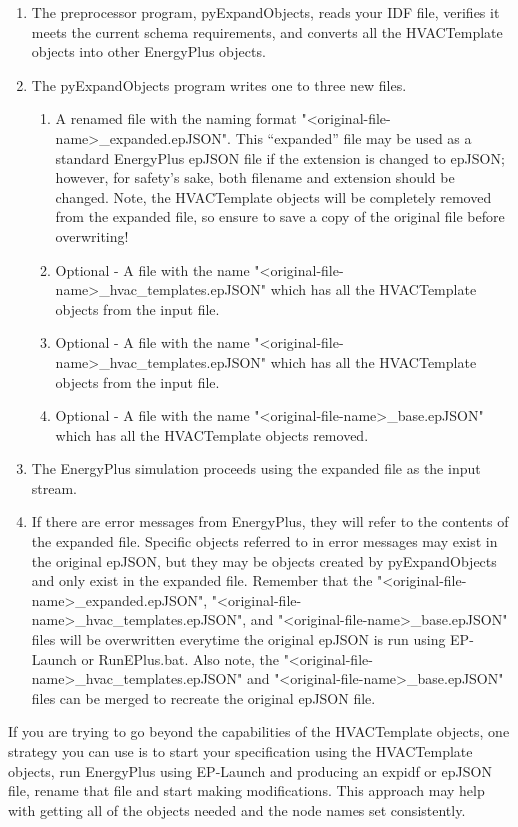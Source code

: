 \begin{enumerate}
\def\labelenumi{\arabic{enumi})}
\item
  The preprocessor program, pyExpandObjects, reads your IDF file, verifies it meets the current schema requirements, and converts all the HVACTemplate objects into other EnergyPlus objects.
\item
  The pyExpandObjects program writes one to three new files.  
  \begin{enumerate}
  \item
    A renamed file with the naming format "<original-file-name>\_expanded.epJSON". This “expanded” file may be used as a standard EnergyPlus epJSON file if the extension is changed to epJSON; however, for safety’s sake, both filename and extension should be changed.  Note, the HVACTemplate objects will be completely removed from the expanded file, so ensure to save a copy of the original file before overwriting!
  \item
    Optional - A file with the name "<original-file-name>\_hvac\_templates.epJSON" which has all the HVACTemplate objects from the input file.
  \item
    Optional - A file with the name "<original-file-name>\_hvac\_templates.epJSON" which has all the HVACTemplate objects from the input file.
  \item
    Optional - A file with the name "<original-file-name>\_base.epJSON" which has all the HVACTemplate objects removed.
  \end{enumerate}
  \item
    The EnergyPlus simulation proceeds using the expanded file as the input stream.
  \item
    If there are error messages from EnergyPlus, they will refer to the contents of the expanded file. Specific objects referred to in error messages may exist in the original epJSON, but they may be objects created by pyExpandObjects and only exist in the expanded file. Remember that the "<original-file-name>\_expanded.epJSON", "<original-file-name>\_hvac\_templates.epJSON", and "<original-file-name>\_base.epJSON" files will be overwritten everytime the original epJSON is run using EP-Launch or RunEPlus.bat.  Also note, the "<original-file-name>\_hvac\_templates.epJSON" and "<original-file-name>\_base.epJSON" files can be merged to recreate the original epJSON file.
\end{enumerate}

If you are trying to go beyond the capabilities of the HVACTemplate objects, one strategy you can use is to start your specification using the HVACTemplate objects, run EnergyPlus using EP-Launch and producing an expidf or epJSON file, rename that file and start making modifications. This approach may help with getting all of the objects needed and the node names set consistently.

